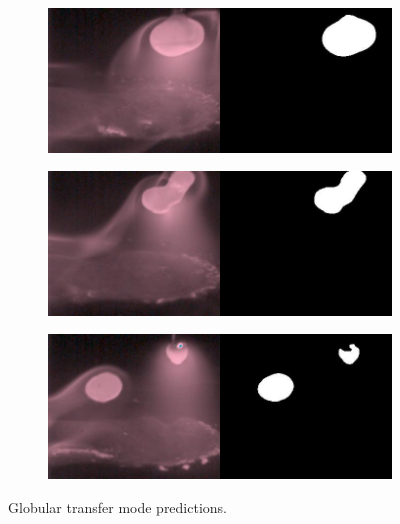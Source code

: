 \begin{figure}
\centering
  \begin{subfigure}[b]{0.45\textwidth}
    \includegraphics[width=\linewidth]{Images/Results/glob_pred_0.jpg}
    \caption{}

  \end{subfigure}
\hfill
  \begin{subfigure}[b]{0.45\textwidth}
    \includegraphics[width=\linewidth]{Images/Results/glob_pred_3870.jpg}
    \caption{}

  \end{subfigure}
  \begin{subfigure}[b]{0.45\textwidth}
    \includegraphics[width=\linewidth]{Images/Results/glob_pred_4817.jpg}
    \caption{}

  \end{subfigure}
    \caption[Globular transfer mode predictions]{Globular transfer mode predictions.}
    \label{fig:glob_pred_samples}
\end{figure}

